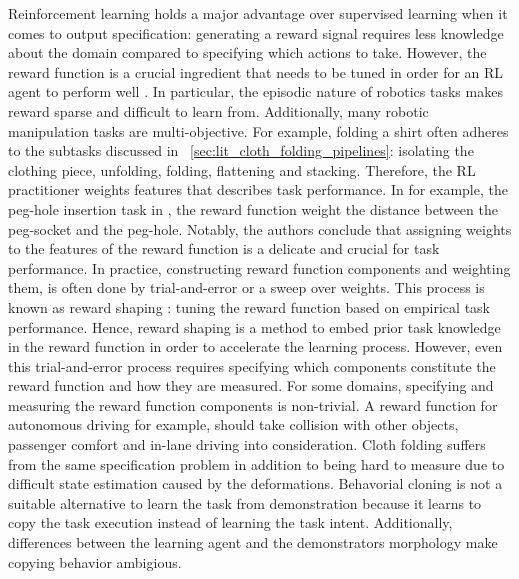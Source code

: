\documentclass[\home/main.tex]{subfiles}
\begin{document}
Reinforcement learning holds a major advantage over supervised learning when it comes to output specification: generating a reward signal requires less knowledge about the domain compared to specifying which actions to take. However, the reward function is a crucial ingredient that needs to be tuned in order for an RL agent to perform well \autocite{Sutton2018}. In particular, the episodic nature of robotics tasks makes reward sparse and difficult to learn from. Additionally, many robotic manipulation tasks are multi-objective. For example, folding a shirt often adheres to the subtasks discussed in ~\cref{sec:lit_cloth_folding_pipelines}: isolating the clothing piece, unfolding, folding, flattening and stacking. Therefore, the RL practitioner weights features that describes task performance. In for example, the peg-hole insertion task in \autocite{vecerik2018leveraging}, the reward function weight the distance between the peg-socket and the peg-hole. Notably, the authors conclude that assigning weights to the features of the reward function is a delicate and crucial for task performance. In practice, constructing reward function components and weighting them, is often done by trial-and-error or a sweep over weights.
This process is known as reward shaping \autocite{laud2004theory}: tuning the reward function based on empirical task performance. Hence, reward shaping is a method to embed prior task knowledge in the reward function in order to accelerate the learning process. However, even this trial-and-error process requires specifying which components constitute the reward function and how they are measured. For some domains, specifying and measuring the reward function components is non-trivial. A reward function for autonomous driving for example, should take collision with other objects, passenger comfort and in-lane driving into consideration. Cloth folding suffers from the same specification problem in addition to being hard to measure due to difficult state estimation caused by the deformations. Behavorial cloning is not a suitable alternative to learn the task from demonstration because it learns to copy the task execution instead of learning the task intent. Additionally, differences between the learning agent and the demonstrators morphology make copying behavior ambigious. 
\end{document}
